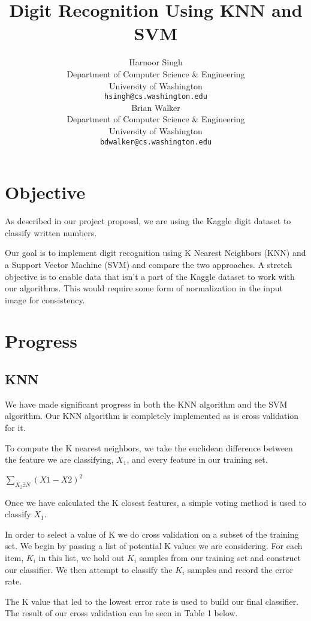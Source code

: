 \documentclass{article} %
\title{Digit Recognition Using KNN and SVM}
\author{
Harnoor Singh \\
Department of Computer Science \& Engineering\\
University of Washington \\
\texttt{hsingh@cs.washington.edu} \\
\And
Brian Walker \\
Department of Computer Science \& Engineering \\
University of Washington \\
\texttt{bdwalker@cs.washington.edu} \\
}
\begin{document}
\maketitle

\section{Objective}

As described in our project proposal, we are using the Kaggle digit dataset to classify written numbers.

Our goal is to implement digit recognition using K Nearest Neighbors (KNN) and a Support Vector Machine (SVM) and compare the two approaches. A stretch objective is to enable data that isn't a part of the Kaggle dataset to work with our algorithms. This would require some form of normalization in the input image for consistency.

\section{Progress}

\subsection{KNN}

We have made significant progress in both the KNN algorithm and the SVM algorithm. Our KNN algorithm is completely implemented as is cross validation for it. 

To compute the K nearest neighbors, we take the euclidean difference between the feature we are classifying, $X_1$, and every feature in our training set.

\begin{center}
$\sum\limits_{X_2 \exists N} {(X1 - X2)^2}$
\end{center}

Once we have calculated the K closest features, a simple voting method is used to classify $X_1$.

In order to select a value of K we do cross validation on a subset of the training set. We begin by passing a list of potential K values we are considering. For each item, $K_i$ in this list, we hold out $K_i$ samples from our training set and construct our classifier. We then attempt to classify the $K_i$ samples and record the error rate. 

The K value that led to the lowest error rate is used to build our final classifier. The result of our cross validation can be seen in Table 1 below.
\end{document}
